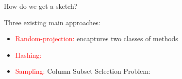 \documentclass[first=dgreen,second=purple,logo=redque]{aaltoslides}
\begin{document}
\begin{frame}[allowframebreaks=1]{How do we get a sketch?}

Three existing main approaches:
\begin{itemize}
\item \textcolor{red}{Random-projection:} encaptures two classes of methods
\item \textcolor{red}{Hashing:} 
\item \textcolor{red}{Sampling:} \textcolor{dgreen}{Column Subset Selection Problem}:
\end{itemize}


\end{frame}
\end{document}
